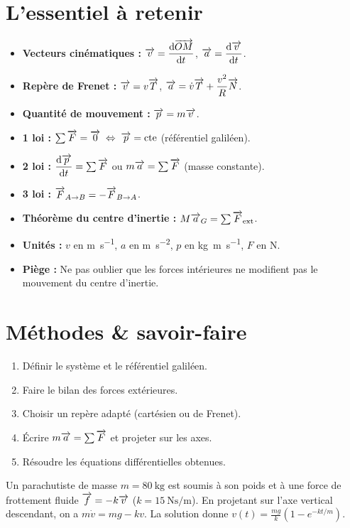 \section{L’essentiel à retenir}

\begin{synthese}
\begin{itemize}
\item \textbf{Vecteurs cinématiques :} $\overrightarrow{v}=\dfrac{\mathrm{d}\overrightarrow{OM}}{\mathrm{d}t}$, $\overrightarrow{a}=\dfrac{\mathrm{d}\overrightarrow{v}}{\mathrm{d}t}$.
\item \textbf{Repère de Frenet :} $\overrightarrow{v}=v\overrightarrow{T}$, $\overrightarrow{a}=\dot{v}\overrightarrow{T}+\dfrac{v^{2}}{R}\overrightarrow{N}$.
\item \textbf{Quantité de mouvement :} $\overrightarrow{p}=m\overrightarrow{v}$.
\item \textbf{1\iere{} loi :} $\sum\overrightarrow{F}=\overrightarrow{0}\;\Leftrightarrow\;\overrightarrow{p}=\text{cte}$ (référentiel galiléen).
\item \textbf{2\ieme{} loi :} $\dfrac{\mathrm{d}\overrightarrow{p}}{\mathrm{d}t}=\sum\overrightarrow{F}$ ou $m\overrightarrow{a}=\sum\overrightarrow{F}$ (masse constante).
\item \textbf{3\ieme{} loi :} $\overrightarrow{F}_{A\to B}=-\overrightarrow{F}_{B\to A}$.
\item \textbf{Théorème du centre d’inertie :} $M\overrightarrow{a}_G=\sum\overrightarrow{F}_{\text{ext}}$.
\item \textbf{Unités :} $v$ en \si{\metre\per\second}, $a$ en \si{\metre\per\second\squared}, $p$ en \si{\kilogram\metre\per\second}, $F$ en \si{\newton}.
\item \textbf{Piège :} Ne pas oublier que les forces intérieures ne modifient pas le mouvement du centre d’inertie.
\end{itemize}
\end{synthese}

\section{Méthodes \& savoir-faire}

\begin{enumerate}
\item Définir le système et le référentiel galiléen.
\item Faire le bilan des forces extérieures.
\item Choisir un repère adapté (cartésien ou de Frenet).
\item Écrire $m\overrightarrow{a}=\sum\overrightarrow{F}$ et projeter sur les axes.
\item Résoudre les équations différentielles obtenues.
\end{enumerate}
\begin{exemple}
Un parachutiste de masse $m=\SI{80}{\kilogram}$ est soumis à son poids et à une force de frottement fluide $\overrightarrow{f}=-k\overrightarrow{v}$ ($k=\SI{15}{\newton\second\per\metre}$). En projetant sur l’axe vertical descendant, on a $m\dot{v}=mg-kv$. La solution donne $v(t)=\frac{mg}{k}(1-e^{-kt/m})$.
\end{exemple}

